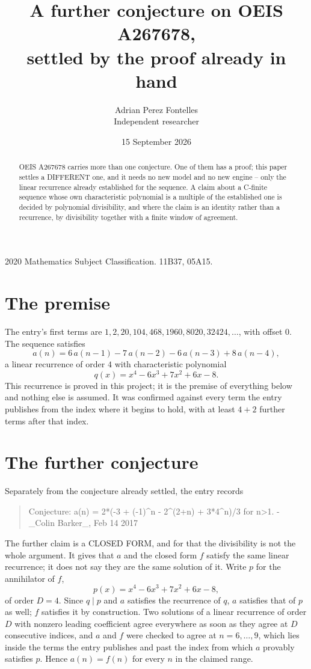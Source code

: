 \documentclass[11pt,a4paper]{article}
\title{A further conjecture on OEIS A267678,\\ \large settled by the proof already in hand}
\author{Adrian Perez Fontelles\\ \small Independent researcher}
\date{15 September 2026}
\theoremstyle{plain}
\theoremstyle{definition}
\begin{document}
\maketitle

\begin{abstract}
OEIS A267678 carries more than one conjecture. One of them has a proof; this paper settles a
DIFFERENT one, and it needs no new model and no new engine -- only the linear recurrence already
established for the sequence. A claim about a C-finite sequence whose own characteristic
polynomial is a multiple of the established one is decided by polynomial divisibility, and where
the claim is an identity rather than a recurrence, by divisibility together with a finite window
of agreement.
\end{abstract}

\noindent\small 2020 Mathematics Subject Classification. 11B37, 05A15.\normalsize

\section{The premise}

The entry's first terms are $1, 2, 20, 104, 468, 1960, 8020, 32424,\dots$, with offset $0$. The sequence satisfies
\[
  a(n)=6\,a(n-1) - 7\,a(n-2) - 6\,a(n-3) + 8\,a(n-4) ,
\]
a linear recurrence of order $4$ with characteristic polynomial
\[
  q(x)=x^{4} - 6 x^{3} + 7 x^{2} + 6 x - 8 .
\]
This recurrence is proved in this project; it is the premise of everything below and nothing else is assumed.
It was confirmed against every term the entry publishes from the index where it begins to hold,
with at least $4+2$ further terms after that index.

\section{The further conjecture}

Separately from the conjecture already settled, the entry records

\begin{quote}\raggedright Conjecture: a(n) = 2*(-3 + (-1)\^{}n - 2\^{}(2+n) + 3*4\^{}n)/3 for n>1. - \_Colin Barker\_, Feb 14 2017\end{quote}

The further claim is a CLOSED FORM, and for that the divisibility is not the whole argument. It
gives that $a$ and the closed form $f$ satisfy the same linear recurrence; it does not say they
are the same solution of it. Write $p$ for the annihilator of $f$,
\[
  p(x)=x^{4} - 6 x^{3} + 7 x^{2} + 6 x - 8 ,
\]
of order $D=4$. Since $q\mid p$ and $a$ satisfies the recurrence of $q$, $a$ satisfies that of
$p$ as well; $f$ satisfies it by construction. Two solutions of a linear recurrence of order $D$
with nonzero leading coefficient agree everywhere as soon as they agree at $D$ consecutive
indices, and $a$ and $f$ were checked to agree at $n=6,\dots,9$,
which lies inside the terms the entry publishes and past the index from which $a$ provably
satisfies $p$. Hence $a(n)=f(n)$ for every $n$ in the claimed range.
\end{document}
